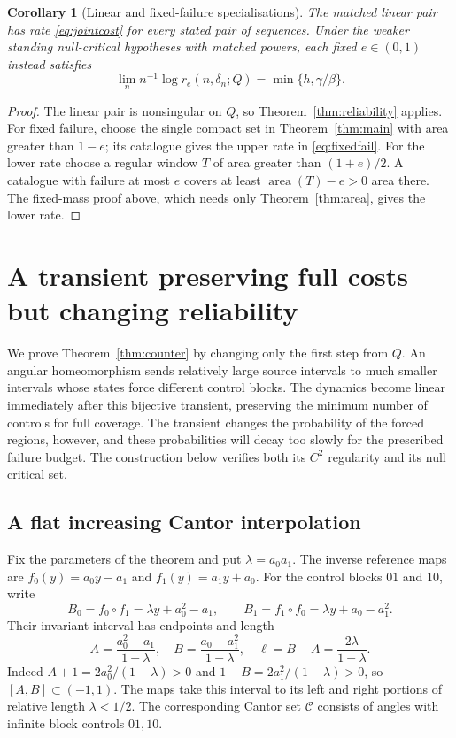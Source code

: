 \documentclass[11pt]{amsart}
\newtheorem{corollary}[theorem]{Corollary}
\theoremstyle{definition}
\theoremstyle{remark}
\newcommand{\area}{\operatorname{area}}
\numberwithin{equation}{section}
\begin{document}
\begin{corollary}[Linear and fixed-failure specialisations]\label{cor:failure}
The matched linear pair has rate \eqref{eq:jointcost} for every
stated pair of sequences. Under the weaker standing null-critical
hypotheses with matched powers, each fixed $e\in(0,1)$ instead satisfies
\begin{equation}\label{eq:fixedfail}
\lim_n n^{-1}\log r_e(n,\delta_n;Q)=\min\{h,\gamma/\beta\}.
\end{equation}
\end{corollary}
\begin{proof}
The linear pair is nonsingular on $Q$, so
Theorem~\ref{thm:reliability} applies.
For fixed failure, choose the single compact set in
Theorem~\ref{thm:main} with area greater than $1-e$; its catalogue
gives the upper rate in \eqref{eq:fixedfail}.
For the lower rate choose a regular window $T$ of area greater
than $(1+e)/2$. A catalogue with failure at most $e$ covers at
least $\area(T)-e>0$ area there. The fixed-mass proof above,
which needs only Theorem~\ref{thm:area}, gives the lower rate.
\end{proof}

\section{A transient preserving full costs but changing reliability}
\label{sec:counter}
We prove Theorem~\ref{thm:counter} by changing only the first step
from $Q$. An angular homeomorphism sends relatively large source
intervals to much smaller intervals whose states force different
control blocks. The dynamics become linear immediately after this
bijective transient, preserving the minimum number of controls
for full coverage. The transient changes the
probability of the forced regions, however, and these probabilities
will decay too slowly for the prescribed failure budget. The
construction below verifies both its $C^2$ regularity and its null
critical set.

\subsection{A flat increasing Cantor interpolation}
Fix the parameters of the theorem and put $\lambda=a_0a_1$.
The inverse reference maps are $f_0(y)=a_0y-a_1$ and
$f_1(y)=a_1y+a_0$. For the control blocks $01$ and $10$, write
\[
B_0=f_0\circ f_1=\lambda y+a_0^2-a_1,\qquad
B_1=f_1\circ f_0=\lambda y+a_0-a_1^2.
\]
Their invariant interval has endpoints and length
\begin{equation}\label{eq:cantorendpoints}
A=\frac{a_0^2-a_1}{1-\lambda},\quad
B=\frac{a_0-a_1^2}{1-\lambda},\quad
\ell=B-A=\frac{2\lambda}{1-\lambda}.
\end{equation}
Indeed $A+1=2a_0^2/(1-\lambda)>0$ and
$1-B=2a_1^2/(1-\lambda)>0$, so $[A,B]\subset(-1,1)$.
The maps take this interval to its left and right portions of
relative length $\lambda<1/2$. The corresponding Cantor set
$\mathcal C$ consists of angles with infinite block controls $01,10$.
\end{document}
